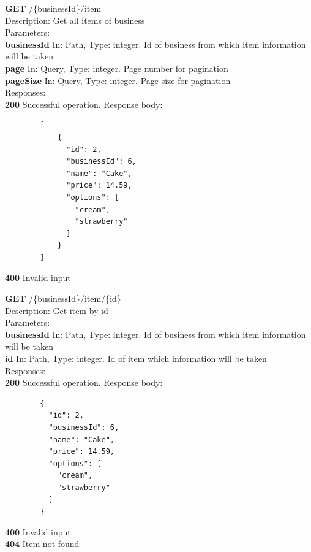 \documentclass[11pt,a4paper,pdftex]{article}
\begin{document}
\hspace*{1em}\textbf{GET} /\{businessId\}/item\\
\hspace*{2em}Description: Get all items of business\\
\hspace*{2em}Parameters:\\
\hspace*{3em}\textbf{businessId} In: Path, Type: integer. Id of business from which item information will be taken\\
\hspace*{3em}\textbf{page} In: Query, Type: integer. Page number for pagination\\
\hspace*{3em}\textbf{pageSize} In: Query, Type: integer. Page size for pagination\\
\hspace*{2em}Responses:\\
\hspace*{3em}\textbf{200} Successful operation. Response body:
\begin{verbatim}
        [
            {
              "id": 2,
              "businessId": 6,
              "name": "Cake",
              "price": 14.59,
              "options": [
                "cream",
                "strawberry"
              ]
            }
        ]
\end{verbatim}
\hspace*{3em}\textbf{400} Invalid input

\hspace*{1em}\textbf{GET} /\{businessId\}/item/\{id\}\\
\hspace*{2em}Description: Get item by id\\
\hspace*{2em}Parameters:\\
\hspace*{3em}\textbf{businessId} In: Path, Type: integer. Id of business from which item information will be taken\\
\hspace*{3em}\textbf{id} In: Path, Type: integer. Id of item which information will be taken\\
\hspace*{2em}Responses:\\
\hspace*{3em}\textbf{200} Successful operation. Response body:
\begin{verbatim}
        {
          "id": 2,
          "businessId": 6,
          "name": "Cake",
          "price": 14.59,
          "options": [
            "cream",
            "strawberry"
          ]
        }
\end{verbatim}
\hspace*{3em}\textbf{400} Invalid input\\
\hspace*{3em}\textbf{404} Item not found
\end{document}
